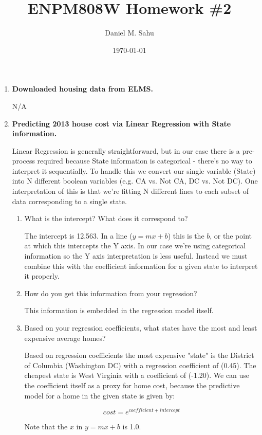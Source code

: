 \documentclass[12pt]{article}
\title{ENPM808W Homework \#2}
\author{Daniel M. Sahu}
\date{\today}
\begin{document}
\maketitle
\begin{enumerate}[leftmargin=\labelsep]
\item \textbf{Downloaded housing data from ELMS.}

  N/A

\item \textbf{Predicting 2013 house cost via Linear Regression with State information.}

  Linear Regression is generally straightforward, but in our case there is a pre-process required because State information is categorical - there's no way to interpret it sequentially. To handle this we convert our single variable (State) into N different boolean variables (e.g. CA vs. Not CA, DC vs. Not DC). One interpretation of this is that we're fitting N different lines to each subset of data corresponding to a single state.

  \begin{enumerate}[label=(\alph*)]
  \item What is the intercept? What does it correspond to?

    The intercept is 12.563. In a line (\(y = mx + b\)) this is the \(b\), or the point at which this intercepts the Y axis. In our case we're using categorical information so the Y axis interpretation is less useful. Instead we must combine this with the coefficient information for a given state to interpret it properly.

  \item How do you get this information from your regression?

    This information is embedded in the regression model itself.

  \item Based on your regression coefficients, what states have the most and least expensive average homes?

    Based on regression coefficients the most expensive "state" is the District of Columbia (Washington DC) with a regression coefficient of (0.45). The cheapest state is West Virginia with a coefficient of (-1.20). We can use the coefficient itself as a proxy for home cost, because the predictive model for a home in the given state is given by:

      \[ cost = e^{coefficient + intercept} \]

    Note that the \(x\) in \(y = mx + b\) is 1.0.


\end{enumerate}
\end{enumerate}
\end{document}
